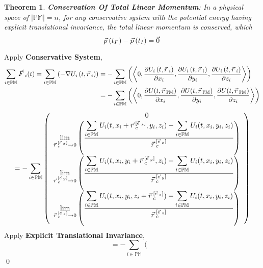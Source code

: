 \documentclass[12pt]{amsart}
\newtheorem{theorem}{Theorem}[section]
\renewenvironment{proof}{{\bfseries Proof.}}{\qed}
\let\oldvec\vec
\renewcommand{\vec}[1]{\oldvec{#1}\hspace{0.1em}}
\begin{document}
\begin{theorem}
    \textbf{Conservation Of Total Linear Momentum}: In a physical space of $\left | \mathbb{PM} \right | = n$, for any conservative system with the potential energy having explicit translational invariance, the total linear momentum is conserved, which $$ \vec{p}(t_F) - \vec{p}(t_I)  = \vec{0} $$
\end{theorem}

\begin{proof}
    Apply \textbf{Conservative System},
    \begin{align*}\displaystyle \sum_{i \in \mathbb{PM}} \vec{F}_i (t) = \displaystyle \sum_{i \in \mathbb{PM}} \left ( - \nabla  U_i \left ( t, \vec{r}_{i} \right ) \right ) &= - \displaystyle \sum_{i \in \mathbb{PM}} \left ( \left < 0, \dfrac{\partial  U_i \left ( t, \vec{r}_i \right )}{\partial x_i}, \dfrac{\partial  U_i \left ( t, \vec{r}_i \right )}{\partial y_i}, \dfrac{\partial  U_i \left ( t, \vec{r}_i \right )}{\partial z_i} \right > \right ) \\ &= - \displaystyle \sum_{i \in \mathbb{PM}} \left ( \left < 0, \dfrac{\partial U  (t, \vec{r}_\mathbb{PM})}{\partial x_i}, \dfrac{\partial U  (t, \vec{r}_\mathbb{PM})}{\partial y_i}, \dfrac{\partial U  (t, \vec{r}_\mathbb{PM})}{\partial z_i} \right > \right ) \end{align*}
     $$ = - \displaystyle \sum_{i \in \mathbb{PM}} \left( \begin{array}{c}
0 \\
\displaystyle \lim_{\vec{r}_c^{[\vec{e}_x]} \to 0} \left( \dfrac{\displaystyle \sum_{i \in \mathbb{PM}}  U_i(t, x_i+\vec{r}_c^{[\vec{e}_x]}, y_i, z_i)  - \displaystyle \sum_{i \in \mathbb{PM}}  U_i(t, x_i, y_i, z_i) }{\vec{r}_c^{[\vec{e}_x]}} \right) \\
\displaystyle \lim_{\vec{r}_c^{[\vec{e}_y]} \to 0} \left( \dfrac{\displaystyle \sum_{i \in \mathbb{PM}}  U_i(t, x_i, y_i+\vec{r}_c^{[\vec{e}_y]}, z_i) - \displaystyle \sum_{i \in \mathbb{PM}}  U_i(t, x_i, y_i, z_i) }{\vec{r}_c^{[\vec{e}_y]}} \right) \\
\displaystyle \lim_{\vec{r}_c^{[\vec{e}_z]} \to 0} \left( \dfrac{\displaystyle \sum_{i \in \mathbb{PM}} U_i(t, x_i, y_i, z_i+\vec{r}_c^{[\vec{e}_z]}) - \displaystyle \sum_{i \in \mathbb{PM}} U_i(t, x_i, y_i, z_i)}{\vec{r}_c^{[\vec{e}_z]}} \right)
\end{array} \right) $$
Apply \textbf{Explicit Translational Invariance},
$$ = - \displaystyle \sum_{i \in \mathbb{PM}} \left( \begin{array}{c}

\end{array}$$
\end{proof}
\end{document}
